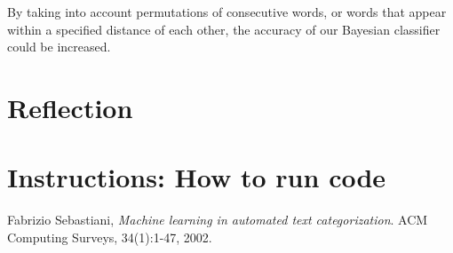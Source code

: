 \documentclass[10pt, a4paper]{article}
\begin{document}
By taking into account permutations of consecutive words, or words that appear within a specified distance of each other, the accuracy of our Bayesian classifier could be increased.

\section{Reflection}

\section{Instructions: How to run code}

\begin{thebibliography}{9}

  Fabrizio Sebastiani,
  \emph{Machine learning in automated text categorization}.
  ACM Computing Surveys,
  34(1):1-47,
  2002.

\end{thebibliography}
\end{document}
